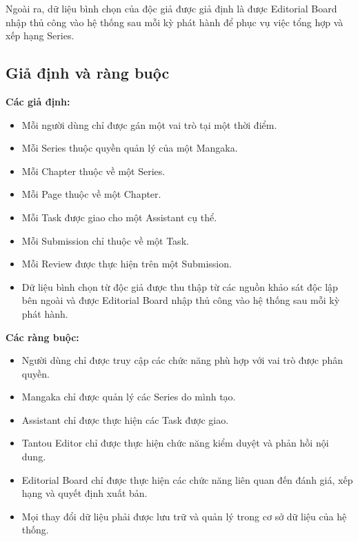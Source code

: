 Ngoài ra, dữ liệu bình chọn của độc giả được giả định là được Editorial Board nhập thủ công vào hệ thống sau mỗi kỳ phát hành để phục vụ việc tổng hợp và xếp hạng Series.

\subsection{Giả định và ràng buộc}
\label{subsec:gia_dinh_rang_buoc}

\textbf{Các giả định:}
\begin{itemize}
    \item Mỗi người dùng chỉ được gán một vai trò tại một thời điểm.
    \item Mỗi Series thuộc quyền quản lý của một Mangaka.
    \item Mỗi Chapter thuộc về một Series.
    \item Mỗi Page thuộc về một Chapter.
    \item Mỗi Task được giao cho một Assistant cụ thể.
    \item Mỗi Submission chỉ thuộc về một Task.
    \item Mỗi Review được thực hiện trên một Submission.
    \item Dữ liệu bình chọn từ độc giả được thu thập từ các nguồn khảo sát độc lập bên ngoài và được Editorial Board nhập thủ công vào hệ thống sau mỗi kỳ phát hành.
\end{itemize}

\textbf{Các ràng buộc:}
\begin{itemize}
    \item Người dùng chỉ được truy cập các chức năng phù hợp với vai trò được phân quyền.
    \item Mangaka chỉ được quản lý các Series do mình tạo.
    \item Assistant chỉ được thực hiện các Task được giao.
    \item Tantou Editor chỉ được thực hiện chức năng kiểm duyệt và phản hồi nội dung.
    \item Editorial Board chỉ được thực hiện các chức năng liên quan đến đánh giá, xếp hạng và quyết định xuất bản.
    \item Mọi thay đổi dữ liệu phải được lưu trữ và quản lý trong cơ sở dữ liệu của hệ thống.
\end{itemize}


